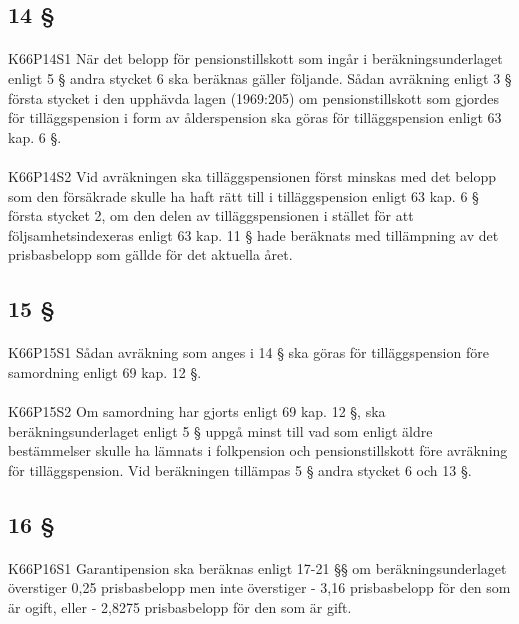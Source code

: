\documentclass[a4paper,notitlepage,openany,10pt]{book}
\begin{document}
\subsection*{14 §}
\paragraph*{}
{\tiny K66P14S1}
När det belopp för pensionstillskott som ingår i beräkningsunderlaget enligt 5 § andra stycket 6 ska beräknas gäller följande. Sådan avräkning enligt 3 § första stycket i den upphävda lagen (1969:205) om pensionstillskott som gjordes för tilläggspension i form av ålderspension ska göras för tilläggspension enligt 63 kap. 6 §.
\paragraph*{}
{\tiny K66P14S2}
Vid avräkningen ska tilläggspensionen först minskas med det belopp som den försäkrade skulle ha haft rätt till i tilläggspension enligt 63 kap. 6 § första stycket 2, om den delen av tilläggspensionen i stället för att följsamhetsindexeras enligt 63 kap. 11 § hade beräknats med tillämpning av det prisbasbelopp som gällde för det aktuella året.
\subsection*{15 §}
\paragraph*{}
{\tiny K66P15S1}
Sådan avräkning som anges i 14 § ska göras för tilläggspension före samordning enligt 69 kap. 12 §.
\paragraph*{}
{\tiny K66P15S2}
Om samordning har gjorts enligt 69 kap. 12 §, ska beräkningsunderlaget enligt 5 § uppgå minst till vad som enligt äldre bestämmelser skulle ha lämnats i folkpension och pensionstillskott före avräkning för tilläggspension. Vid beräkningen tillämpas 5 § andra stycket 6 och 13 §.
\subsection*{16 §}
\paragraph*{}
{\tiny K66P16S1}
Garantipension ska beräknas enligt 17-21 §§ om beräkningsunderlaget överstiger 0,25 prisbasbelopp men inte överstiger
\newline - 3,16 prisbasbelopp för den som är ogift, eller
\newline - 2,8275 prisbasbelopp för den som är gift.
\end{document}

